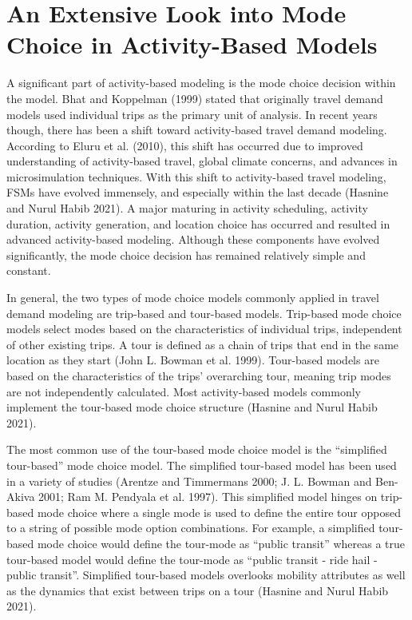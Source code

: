 \documentclass[12pt, oneside, openright]{byuthesis}
\begin{document}
\hypertarget{lit3}{%
\section{An Extensive Look into Mode Choice in Activity-Based Models}\label{lit3}}

A significant part of activity-based modeling is the mode choice decision within the model. Bhat and Koppelman (1999) stated that originally travel demand models used individual trips as the primary unit of analysis. In recent years though, there has been a shift toward activity-based travel demand modeling. According to Eluru et al. (2010), this shift has occurred due to improved understanding of activity-based travel, global climate concerns, and advances in microsimulation techniques. With this shift to activity-based travel modeling, FSMs have evolved immensely, and especially within the last decade (Hasnine and Nurul Habib 2021). A major maturing in activity scheduling, activity duration, activity generation, and location choice has occurred and resulted in advanced activity-based modeling. Although these components have evolved significantly, the mode choice decision has remained relatively simple and constant.

In general, the two types of mode choice models commonly applied in travel demand modeling are trip-based and tour-based models. Trip-based mode choice models select modes based on the characteristics of individual trips, independent of other existing trips. A tour is defined as a chain of trips that end in the same location as they start (John L. Bowman et al. 1999). Tour-based models are based on the characteristics of the trips' overarching tour, meaning trip modes are not independently calculated. Most activity-based models commonly implement the tour-based mode choice structure (Hasnine and Nurul Habib 2021).

The most common use of the tour-based mode choice model is the ``simplified tour-based'' mode choice model. The simplified tour-based model has been used in a variety of studies (Arentze and Timmermans 2000; J. L. Bowman and Ben-Akiva 2001; Ram M. Pendyala et al. 1997). This simplified model hinges on trip-based mode choice where a single mode is used to define the entire tour opposed to a string of possible mode option combinations. For example, a simplified tour-based mode choice would define the tour-mode as ``public transit'' whereas a true tour-based model would define the tour-mode as ``public transit - ride hail - public transit''. Simplified tour-based models overlooks mobility attributes as well as the dynamics that exist between trips on a tour (Hasnine and Nurul Habib 2021).
\end{document}
